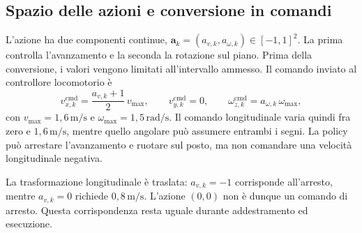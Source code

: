 \begin{table}[tbp]
    \centering
    \caption[Componenti dell'osservazione dell'actor]{Informazioni utilizzate dalla policy di navigazione. Il riferimento e le unità delle misure sono distinti dalle trasformazioni di normalizzazione applicate prima dell'elaborazione nelle reti.}
    \label{tab:metodo-osservazioni}
\end{table}

\subsection{Spazio delle azioni e conversione in comandi}

L'azione ha due componenti continue, $\mathbf a_k=(a_{v,k},a_{\omega,k})\in[-1,1]^2$. La prima controlla l'avanzamento e la seconda la rotazione sul piano. Prima della conversione, i valori vengono limitati all'intervallo ammesso. Il comando inviato al controllore locomotorio è
\begin{equation}
    v_{x,k}^{\mathrm{cmd}}=\frac{a_{v,k}+1}{2}\,v_{\max},
    \qquad v_{y,k}^{\mathrm{cmd}}=0,
    \qquad \omega_{z,k}^{\mathrm{cmd}}=a_{\omega,k}\,\omega_{\max},
    \label{eq:metodo-conversione-azioni}
\end{equation}
con $v_{\max}=1{,}6\,\mathrm{m/s}$ e $\omega_{\max}=1{,}5\,\mathrm{rad/s}$. Il comando longitudinale varia quindi fra zero e $1{,}6\,\mathrm{m/s}$, mentre quello angolare può assumere entrambi i segni. La policy può arrestare l'avanzamento e ruotare sul posto, ma non comandare una velocità longitudinale negativa.

La trasformazione longitudinale è traslata: $a_{v,k}=-1$ corrisponde all'arresto, mentre $a_{v,k}=0$ richiede $0{,}8\,\mathrm{m/s}$. L'azione $(0,0)$ non è dunque un comando di arresto. Questa corrispondenza resta uguale durante addestramento ed esecuzione.

